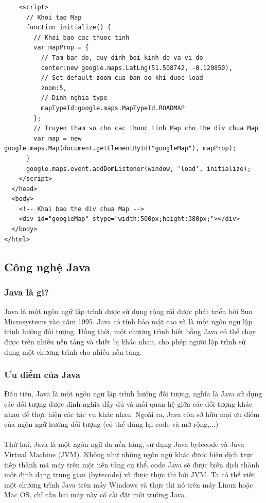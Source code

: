 \documentclass[a4paper]{article}
\begin{document}
\begin{itemize}
\begin{lstlisting}
    <script>
      // Khoi tao Map
      function initialize() {
        // Khai bao cac thuoc tinh
        var mapProp = {
          // Tam ban do, quy dinh boi kinh do va vi do
          center:new google.maps.LatLng(51.508742, -0.120850),
          // Set default zoom cua ban do khi duoc load
          zoom:5,
          // Dinh nghia type
          mapTypeId:google.maps.MapTypeId.ROADMAP
        };
        // Truyen tham so cho cac thuoc tinh Map cho the div chua Map
        var map = new google.maps.Map(document.getElementById("googleMap"), mapProp);
      }
      google.maps.event.addDomListener(window, 'load', initialize);
    </script>
  </head>
  <body>
    <!-- Khai bao the div chua Map -->
    <div id="googleMap" stype="width:500px;height:380px;"></div>
  </body>
</html>
\end{lstlisting}
\end{itemize}
\subsection{Công nghệ Java}
\subsubsection{Java là gì?}
Java là một ngôn ngữ lập trình được sử dụng rộng rãi được phát triển bởi Sun Microsystems vào năm 1995. Java có tính bảo mật cao và là một ngôn ngữ lập trình hướng đối tượng. Đồng thời, một chương trình biết bằng Java có thể chạy được trên nhiều nền tảng và thiết bị khác nhau, cho phép người lập trình sử dụng một chương trình cho nhiều nền tảng.
\subsubsection{Ưu điểm của Java}
Đầu tiên, Java là một ngôn ngữ lập trình hướng đối tượng, nghĩa là Java sử dụng các đối tượng được định nghĩa đầy đủ và mối quan hệ giữa các đối tượng khác nhau để thực hiện các tác vụ khác nhau. Ngoài ra, Java còn sở hữu mọi ưu điểm của ngôn ngữ hướng đối tượng (có thể dùng lại code và mở rộng,...)\\ \\
Thứ hai, Java là một ngôn ngữ đa nền tảng, sử dụng Java bytecode và Java Virtual Machine (JVM). Không như những ngôn ngữ khác được biên dịch trực tiếp thành mã máy trên một nền tảng cụ thể, code Java sẽ được biên dịch thành một định dạng trung gian (bytecode) và được thực thi bởi JVM. Ta có thể viết một chương trình Java trên máy Windows và thực thi nó trên máy Linux hoặc Mac OS, chỉ cần hai máy này có cài đặt môi trường Java.
\end{document}
